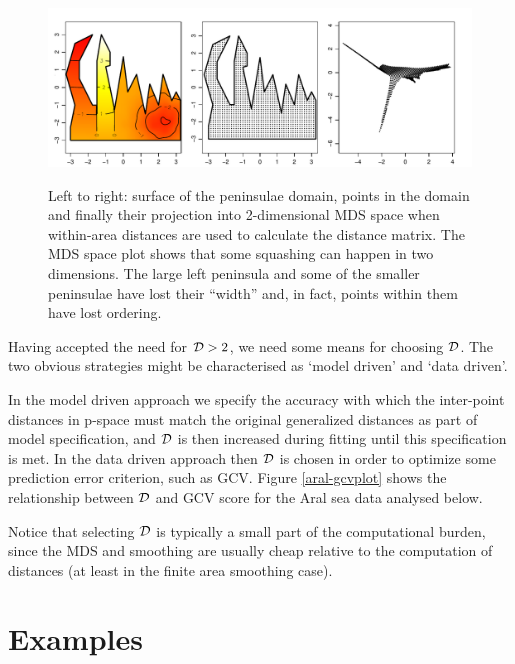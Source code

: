 \documentclass[useAMS, referee]{biom}
\begin{document}
\begin{figure}
\centering
\includegraphics[width=\textwidth]{examples/wt2/wt2-plot.pdf} \\
\caption{Left to right: surface of the peninsulae domain, points in the domain and finally their projection into 2-dimensional MDS space when within-area distances are used to calculate the distance matrix. The MDS space plot shows that some squashing can happen in two dimensions. The large left peninsula and some of the smaller peninsulae have lost their ``width'' and, in fact, points within them have lost ordering.}
\label{wt2-plot}
\end{figure}

Having accepted the need for ${\cal D}>2$, we need some means for choosing $\cal D$. The two obvious strategies might be characterised as `model driven' and `data driven'. 

In the model driven approach we specify the accuracy with which the inter-point distances in p-space must match the original generalized distances as part of model specification, and $\cal D$ is then increased during fitting until this specification is met. In the data driven approach then $\cal D$ is chosen in order to optimize some prediction error criterion, such as GCV.  Figure \ref{aral-gcvplot} shows the relationship between $\cal D$ and GCV score for the Aral sea data analysed below.

Notice that selecting $\cal D$ is typically a small part of the computational burden, since the MDS and smoothing are usually cheap relative to the computation of distances (at least in the finite area smoothing case).


\section{Examples}
\label{examples}
\end{document}
